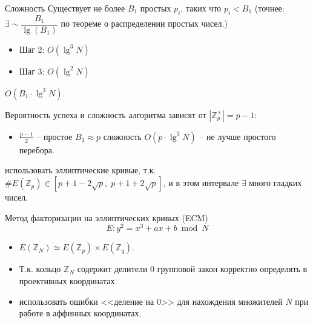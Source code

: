 \documentclass{beamer}
\begin{document}
\begin{frame}{Сложность}
Существует не более $B_1$ простых $p_i$, таких что $p_i < B_1$ (точнее: $\exists \sim \dfrac{B_1}{\lg ( B_1 )}$ по теореме о распределении простых чисел.)
\begin{itemize}
    \item Шаг 2: $O( \lg^3 N )$
    \item Шаг 3: $O( \lg^2 N )$
\end{itemize}
 $O( B_1 \cdot \lg^3 N)$.
\end{frame}

\begin{frame}
 Вероятность успеха и сложность алгоритма зависят от $|\mathbb{Z}_p^\times| = p - 1:$ \\
\begin{itemize}
    \item $\frac{p - 1}{2}$ -- простое \structure{$\Rightarrow$} $ {B_1} \approx p$ \structure{$\Rightarrow$} сложность $O( p \cdot \lg^3 N )$ -- не лучше простого перебора.
\end{itemize}

 использовать эллиптические кривые, т.к.  $\# E( \mathbb{Z}_p ) \in [ p + 1 - 2\sqrt p ,\;p + 1 + 2\sqrt p ]$, и в этом интервале $\exists$ много гладких чисел. 
\end{frame}

\begin{frame}{Метод факторизации на эллиптических кривых (ECM)}
\[E: y^2 = x^3 + a x + b \bmod N\]
\begin{itemize}
    \item $E(\mathbb{Z}_N) \simeq E(\mathbb{Z}_p) \times E(\mathbb{Z}_q)$.
    \item Т.к. кольцо $\mathbb{Z}_N$ содержит делители $0$ групповой закон корректно определять в проективных координатах.
    \item {} использовать ошибки <<деление на $0$>> для нахождения множителей $N$ при работе в аффинных координатах.
\end{itemize}
\end{frame}
\end{document}
